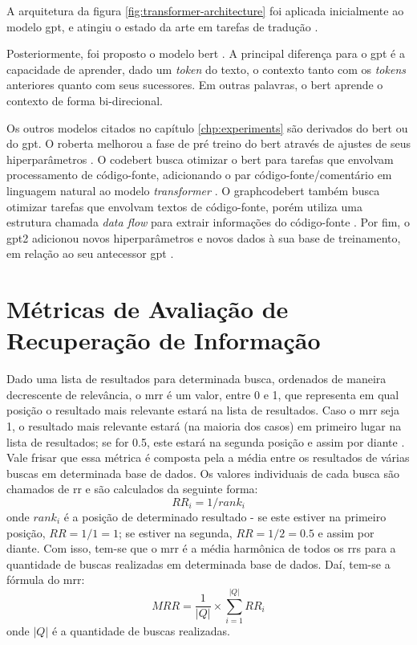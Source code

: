 A arquitetura da figura \ref{fig:transformer-architecture} foi aplicada inicialmente ao modelo \gls{gpt}, e atingiu o estado da arte em tarefas de tradução \cite{Vaswani2017AttentionIA}.

Posteriormente, foi proposto o modelo \gls{bert} \cite{Devlin2019BERTPO}. A principal diferença para o \gls{gpt} é a capacidade de aprender, dado um \textit{token} do texto, o contexto tanto com os \textit{tokens} anteriores quanto com seus sucessores. Em outras palavras, o \gls{bert} aprende o contexto de forma bi-direcional.

Os outros modelos citados no capítulo \ref{chp:experiments} são derivados do \gls{bert} ou do \gls{gpt}. O \gls{roberta} melhorou a fase de pré treino do \gls{bert} através de ajustes de seus hiperparâmetros \cite{Liu2019RoBERTaAR}. O \gls{codebert} busca otimizar o \gls{bert} para tarefas que envolvam processamento de código-fonte, adicionando o par código-fonte/comentário em linguagem natural ao modelo \textit{transformer} \cite{Feng2020CodeBERTAP}. O \gls{graphcodebert} também busca otimizar tarefas que envolvam textos de código-fonte, porém utiliza uma estrutura chamada \textit{data flow} para extrair informações do código-fonte \cite{Guo2021GraphCodeBERTPC}. Por fim, o \gls{gpt2} adicionou novos hiperparâmetros e novos dados à sua base de treinamento, em relação ao seu antecessor \gls{gpt} \cite{Radford2019LanguageMA}.

\section{Métricas de Avaliação de Recuperação de Informação}
Dado uma lista de resultados para determinada busca, ordenados de maneira decrescente de relevância, o \gls{mrr} é um valor, entre 0 e 1, que representa em qual posição o resultado mais relevante estará na lista de resultados. Caso o \gls{mrr} seja 1, o resultado mais relevante estará (na maioria dos casos) em primeiro lugar na lista de resultados; se for 0.5, este estará na segunda posição e assim por diante \cite{Craswell2009}. Vale frisar que essa métrica é composta pela a média entre os resultados de várias buscas em determinada base de dados. Os valores individuais de cada busca são chamados de \gls{rr} e são calculados da seguinte forma:
\begin{equation*}
    RR_i=1/rank_i
\end{equation*}
onde $rank_i$ é a posição de determinado resultado - se este estiver na primeiro posição, $RR=1/1=1$; se estiver na segunda, $RR=1/2=0.5$ e assim por diante. Com isso, tem-se que o \gls{mrr} é a média harmônica de todos os \glspl{rr} para a quantidade de buscas realizadas em determinada base de dados. Daí, tem-se a fórmula do \gls{mrr}:
\begin{equation*}
    MRR = \frac{1}{|Q|} \times \sum_{i=1}^{|Q|} RR_i
\end{equation*}
onde $|Q|$ é a quantidade de buscas realizadas.

